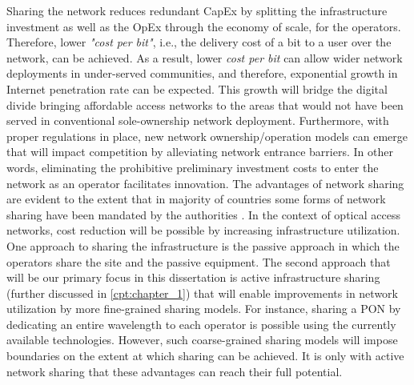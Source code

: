Sharing the network reduces redundant \ac{CapEx} by splitting the infrastructure investment as well as the \ac{OpEx} through the economy of scale, for the operators. Therefore, lower \textit{"cost per bit"}, i.e., the delivery cost of a bit to a user over the network, can be achieved. As a result, lower \textit{cost per bit} can allow wider network deployments in under-served communities, and therefore, exponential growth in Internet penetration rate can be expected. This growth will bridge the digital divide bringing affordable access networks to the areas that would not have been served in conventional sole-ownership network deployment. Furthermore, with proper regulations in place, new network ownership/operation models can emerge that will impact competition by alleviating network entrance barriers. In other words, eliminating the prohibitive preliminary investment costs to enter the network as an operator facilitates innovation.
The advantages of network sharing are evident to the extent that in majority of countries some forms of network sharing have been mandated by the authorities \cite{nepal_sharing}. %
In the context of optical access networks, cost reduction will be possible by increasing infrastructure utilization. One approach to sharing the infrastructure is the passive approach in which the operators share the site and the passive equipment. The second approach that will be our primary focus in this dissertation is active infrastructure sharing (further discussed in \autoref{cpt:chapter_1}) that will enable improvements in network utilization by more fine-grained sharing models. For instance, sharing a \ac{PON} by dedicating an entire wavelength to each operator is possible using the currently available technologies. However, such coarse-grained sharing models will impose boundaries on the extent at which sharing can be achieved. It is only with active network sharing that these advantages can reach their full potential.


